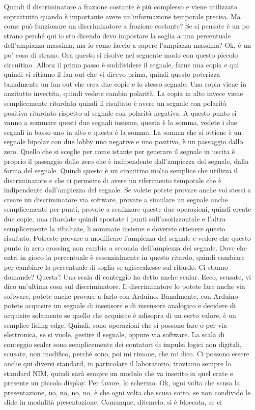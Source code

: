 Quindi il discriminatore a frazione costante è più complesso e viene utilizzato soprattutto quando è importante avere un'informazione temporale precisa. Ma come può funzionare un discriminatore a frazione costante? Se ci pensate è un po strano perché qui io sto dicendo devo impostare la soglia a una percentuale dell'ampiazza massima, ma io come faccio a sapere l'ampiazza massima? Ok, è un po' cosa di strano. Ora questo si risolve nel seguente modo con questo piccolo circuitino. Allora il primo passo è suddividere il segnale, farne una copia e qui quindi vi ritiamo il fan out che vi dicevo prima, quindi questo poterizza banalmente un fan out che crea due copie e lo stesso segnale. Una copia viene in anzitutto invertita, quindi vedete cambia polarità. La copia in alto invece viene semplicemente ritardata quindi il risultato è avere un segnale con polarità positiva ritardato rispetto al segnale con polarità negativa. A questo punto si vanno a sommare questi due segnali insieme, questa è la somma, vedete i due segnali in basso uno in alto e questa è la somma. La somma che si ottiene è un segnale bipolar con due lobby uno negative e uno positivo, è un passaggio dallo zero. Quello che si sceglie per come istante per generare il segnale in uscita è proprio il passaggio dallo zero che è indipendente dall'ampiezza del segnale, dalla forma del segnale. Quindi questo è un circuitino molto semplice che utilizza il discriminatore e che ci permette di avere un riferimento temporale che è indipendente dall'ampiezza del segnale. Se volete potete provare anche voi stessi a creare un discriminatore via software, provate a simulare un segnale anche semplicemente per punti, provate a realizzare queste due operazioni, quindi create due copie, una ritardate quindi spostate i punti sull'asorizzontale e l'altra semplicemente la ribaltate, li sommate insieme e doverste ottenere questo risultato. Potreste provare a modificare l'ampiezza del segnale e vedere che questo punto in zero crossing non cambia a seconda dell'ampiezza del segnale. Dove che entri in gioco la percentuale è essenzialmente in questo ritardo, quindi cambiare per cambiare la percentuale di soglia se agisceakesse sul ritardo. Ci stanno domande? Questa? Una scala di conteggio ho detto anche scalar. Ecco, scusate, vi dico un'ultima cosa sul discriminatore. Il discriminatore lo potete fare anche via software, potete anche provare a farlo con Arduino. Banalmente, con Arduino potete acquisire un segnale di insensore e di insensore analogico e decidere di acquisire solamente se quello che acquisite è adisopra di un certo valore, è un semplice liding edge. Quindi, sono operazioni che si possono fare o per via elettronica, se si vuole, gestire il segnale, oppure via software. La scala di conteggio scaler sono semplicemente dei contatori di impulsi logici non digitali, scusate, non modifico, perché sono, poi mi rimane, che mi dico. Ci possono essere anche qui diversi standard, in particolare il laboratorio, troviamo sempre lo standard NIM, quindi sarà sempre un modulo che va inserito in quel crate e presente un piccolo display. Per favore, lo schermo. Ok, ogni volta che scusa la presentazione, no, no, no, no, è che ogni volta che scusa sotto, se non condivido le slide in modalità presentazione. Comunque, ditemelo, si è bloccata, se ci 